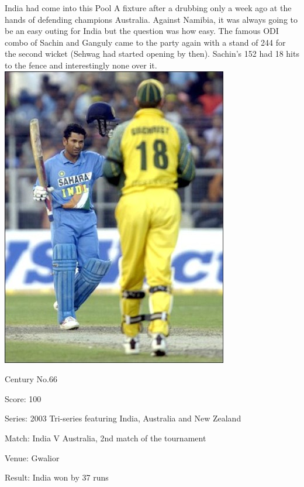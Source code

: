 \documentclass[11pt, a4paper]{article}
\begin{document}
India had come into this Pool A fixture after a drubbing only a week ago at the hands of defending champions Australia. Against Namibia, it was always going to be an easy outing for India but the question was how easy. The famous ODI combo of Sachin and Ganguly came to the party again with a stand of 244 for the second wicket (Sehwag had started opening by then). Sachin's 152 had 18 hits to the fence and interestingly none over it.
\newpage
\includegraphics[height=0.7\textheight]{pics/66.jpg}

Century No.66 

Score: 100 

Series: 2003 Tri-series featuring India, Australia and New Zealand 

Match: India V Australia, 2nd match of the tournament 

Venue: Gwalior 

Result: India won by 37 runs 
\end{document}
